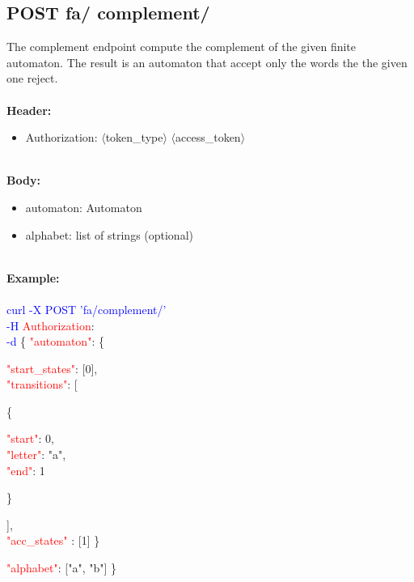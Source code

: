 \subsection{POST fa/ complement/}
The complement endpoint compute the complement of the given finite automaton. The result is an automaton that accept only the words the the given one reject.  \\
\ \\
\textbf{Header:}
\begin{itemize}
    \item Authorization: $\langle$token\_type$\rangle$ $\langle$access\_token$\rangle$
\end{itemize}
\ \\
\textbf{Body:}
\begin{itemize}
    \item automaton: Automaton
    \item alphabet: list of strings (optional)
\end{itemize}
\ \\
\textbf{Example:} \\
\ \\
\textcolor{blue}{curl -X POST '\BaseURL fa/complement/'\\
-H} \textcolor{red}{Authorization}: \Auth \\
\textcolor{blue}{-d} \{ 
     \textcolor{red}{"automaton"}: \{
     \begin{adjustwidth}{7.5 mm}{0 cm}
     \begin{adjustwidth}{7.5 mm}{0 cm}
            \textcolor{red}{"start\_states"}: [0],\\
            \textcolor{red}{"transitions"}: [
            \begin{adjustwidth}{7.5 mm}{0 cm}
            \{
               \begin{adjustwidth}{7.5 mm}{0 cm}
                    \textcolor{red}{"start"}: 0,\\
                    \textcolor{red}{"letter"}: "a",\\
                    \textcolor{red}{"end"}: 1
               \end{adjustwidth}
            \}
            \end{adjustwidth}
            ],\\
        \textcolor{red}{"acc\_states" }: [1]  \}
    \end{adjustwidth}
    \end{adjustwidth}
   \begin{adjustwidth}{7.5 mm}{0 cm}
    \textcolor{red}{"alphabet"}: ["a", "b"] \}
    \end{adjustwidth}

